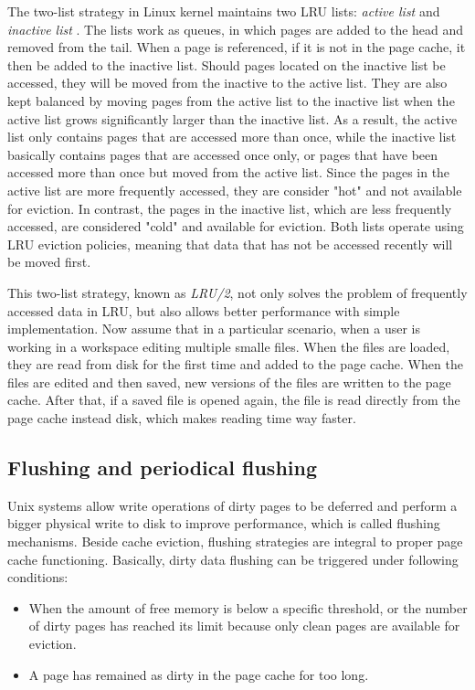 The two-list strategy in Linux kernel maintains two LRU lists: 
\textit{active list} and \textit{inactive list} 
\cite{linuxdev3rd2010,bovet2005understanding}.
The lists work as queues, in which pages are added to the head and 
removed from the tail.
When a page is referenced, if it is not in the page cache, it then be added 
to the inactive list.
Should pages located on the inactive list be accessed, they will be moved 
from the inactive to the active list. 
They are also kept balanced by moving pages from the active list to the 
inactive list when the active list grows significantly larger than the 
inactive list.
As a result, the active list only contains pages that are accessed more 
than once, while the inactive list basically contains pages that are accessed 
once only, or pages that have been accessed more than once but moved 
from the active list.
Since the pages in the active list are more frequently accessed, they are 
consider "hot" and not available for eviction. In contrast, the pages in the 
inactive list, which are less frequently accessed, are considered "cold" 
and available for eviction.
Both lists operate using LRU eviction policies, meaning that data that has
not be accessed recently will be moved first.

This two-list strategy, known as \textit{LRU/2}, not only solves the problem 
of frequently accessed data in LRU, but also allows better performance with 
simple implementation. 
Now assume that in a particular scenario, when a user is working in a 
workspace editing multiple smalle files. When the files are loaded, they are 
read from disk for the first time and added to the page cache. 
When the files are edited and then saved, new versions of the files are 
written to the page cache.
After that, if a saved file is opened again, the file is read directly from 
the page cache instead disk, which makes reading time way faster. 

\subsection{Flushing and periodical flushing}

Unix systems allow write operations of dirty pages to be deferred and perform 
a bigger physical write to disk to improve performance, which is called flushing 
mechanisms. Beside cache eviction, flushing strategies are integral to proper 
page cache functioning.
Basically, dirty data flushing can be triggered under following conditions:

\begin{itemize}
    \item When the amount of free memory is below a specific threshold, or the 
    number of dirty pages has reached its limit because only clean pages are 
    available for eviction.
    \item A page has remained as dirty in the page cache for too long. 
\end{itemize}

